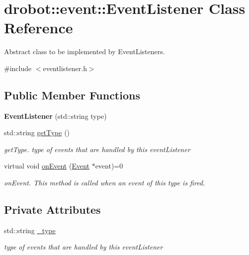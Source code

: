 \hypertarget{classdrobot_1_1event_1_1EventListener}{\section{drobot\-:\-:event\-:\-:Event\-Listener Class Reference}
\label{classdrobot_1_1event_1_1EventListener}
}


Abstract class to be implemented by Event\-Listeners.  




{\ttfamily \#include $<$eventlistener.\-h$>$}

\subsection*{Public Member Functions}
\begin{DoxyCompactItemize}
\item 
\hypertarget{classdrobot_1_1event_1_1EventListener_ad9aa9dca8021eaa6d4499f8dca868305}{{\bfseries Event\-Listener} (std\-::string type)}\label{classdrobot_1_1event_1_1EventListener_ad9aa9dca8021eaa6d4499f8dca868305}

\item 
std\-::string \hyperlink{classdrobot_1_1event_1_1EventListener_af6f3b538bc3595de13959d9e35c0449e}{get\-Type} ()
\begin{DoxyCompactList}\small\item\em get\-Type. type of events that are handled by this event\-Listener \end{DoxyCompactList}\item 
virtual void \hyperlink{classdrobot_1_1event_1_1EventListener_ae5e30e4a518f6752a09f44f8dc6cdc51}{on\-Event} (\hyperlink{classdrobot_1_1event_1_1Event}{Event} $\ast$event)=0
\begin{DoxyCompactList}\small\item\em on\-Event. This method is called when an event of this type is fired. \end{DoxyCompactList}\end{DoxyCompactItemize}
\subsection*{Private Attributes}
\begin{DoxyCompactItemize}
\item 
\hypertarget{classdrobot_1_1event_1_1EventListener_aeb0390f315d94929c93797d858d0fb6e}{std\-::string \hyperlink{classdrobot_1_1event_1_1EventListener_aeb0390f315d94929c93797d858d0fb6e}{\-\_\-type}}\label{classdrobot_1_1event_1_1EventListener_aeb0390f315d94929c93797d858d0fb6e}

\begin{DoxyCompactList}\small\item\em type of events that are handled by this event\-Listener \end{DoxyCompactList}\end{DoxyCompactItemize}


